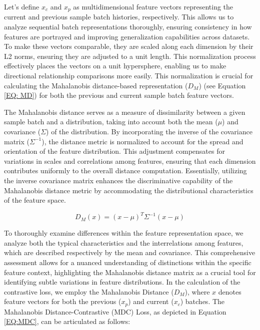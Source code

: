 Let's define \(x_c\) and \(x_p\) as multidimensional feature vectors representing the current and previous sample batch histories, respectively. This allows us to analyze sequential batch representations thoroughly, ensuring consistency in how features are portrayed and improving generalization capabilities across datasets. To make these vectors comparable, they are scaled along each dimension by their L2 norms, ensuring they are adjusted to a unit length. This normalization process effectively places the vectors on a unit hypersphere, enabling us to make directional relationship comparisons more easily. This normalization is crucial for calculating the Mahalanobis distance-based representation (\(D_M\)) (see Equation \ref{EQ: MD}) for both the previous and current sample batch feature vectors.

The Mahalanobis distance serves as a measure of dissimilarity between a given sample batch and a distribution, taking into account both the mean (\(\mu\)) and covariance (\(\Sigma\)) of the distribution. By incorporating the inverse of the covariance matrix (\(\Sigma^{-1}\)), the distance metric is normalized to account for the spread and orientation of the feature distribution. This adjustment compensates for variations in scales and correlations among features, ensuring that each dimension contributes uniformly to the overall distance computation. Essentially, utilizing the inverse covariance matrix enhances the discriminative capability of the Mahalanobis distance metric by accommodating the distributional characteristics of the feature space.

\begin{equation} \label{EQ: MD}
D_M(x) = (x - \mu)^T \Sigma^{-1} (x - \mu) 
\end{equation}

To thoroughly examine differences within the feature representation space, we analyze both the typical characteristics and the interrelations among features, which are described respectively by the mean and covariance. This comprehensive assessment allows for a nuanced understanding of distinctions within the specific feature context, highlighting the Mahalanobis distance matrix as a crucial tool for identifying subtle variations in feature distributions. In the calculation of the contrastive loss, we employ the Mahalanobis Distance (\(D_M\)), where \(x\) denotes feature vectors for both the previous (\(x_p\)) and current (\(x_c\)) batches. The Mahalanobis Distance-Contrastive (MDC) Loss, as depicted in Equation \ref{EQ:MDC}, can be articulated as follows:

